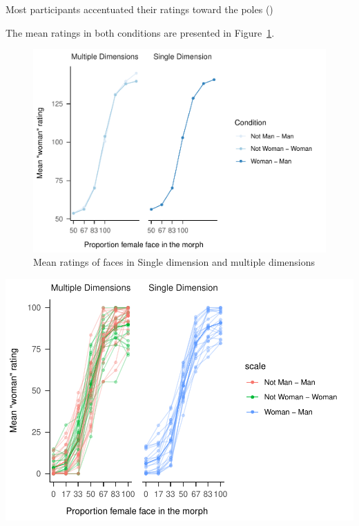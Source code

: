 \documentclass[
  man]{apa7}
\begin{document}
Most participants accentuated their ratings toward the poles ()

The mean ratings in both conditions are presented in Figure~\ref{fig:descriptives-two}.

\begin{figure}
\centering
\includegraphics{resp_opts_manus23022_files/figure-latex/descriptives-two-1.pdf}
\caption{\label{fig:descriptives-two}Mean ratings of faces in Single dimension and multiple dimensions}
\end{figure}

\includegraphics{resp_opts_manus23022_files/figure-latex/unnamed-chunk-2-1.pdf}
\end{document}
